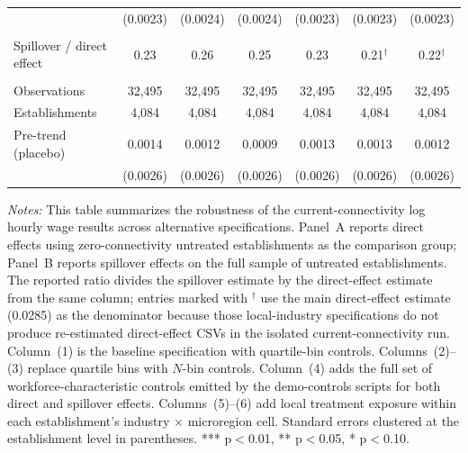 \begin{table}[H]
\begin{tabular}{lcccccc}
 & (0.0023) & (0.0024) & (0.0024) & (0.0023) & (0.0023) & (0.0023)\\
 &  &  &  &  &  & \\
Spillover / direct effect & 0.23 & 0.26 & 0.25 & 0.23 & 0.21$^\dagger$ & 0.22$^\dagger$\\
 &  &  &  &  &  & \\
Observations & 32{,}495 & 32{,}495 & 32{,}495 & 32{,}495 & 32{,}495 & 32{,}495\\
Establishments & 4{,}084 & 4{,}084 & 4{,}084 & 4{,}084 & 4{,}084 & 4{,}084\\
\midrule
Pre-trend (placebo) & 0.0014 & 0.0012 & 0.0009 & 0.0013 & 0.0013 & 0.0012\\
 & (0.0026) & (0.0026) & (0.0026) & (0.0026) & (0.0026) & (0.0026)\\
\bottomrule\bottomrule
\end{tabular}
\begin{minipage}{\linewidth}
    \scriptsize\vspace{4pt}
    \textit{Notes:} This table summarizes the robustness of the current-connectivity log hourly wage results across alternative specifications. Panel~A reports direct effects using zero-connectivity untreated establishments as the comparison group; Panel~B reports spillover effects on the full sample of untreated establishments. The reported ratio divides the spillover estimate by the direct-effect estimate from the same column; entries marked with $^\dagger$ use the main direct-effect estimate (0.0285) as the denominator because those local-industry specifications do not produce re-estimated direct-effect CSVs in the isolated current-connectivity run. Column~(1) is the baseline specification with quartile-bin controls. Columns~(2)--(3) replace quartile bins with $N$-bin controls. Column~(4) adds the full set of workforce-characteristic controls emitted by the demo-controls scripts for both direct and spillover effects. Columns~(5)--(6) add local treatment exposure within each establishment's industry $\times$ microregion cell. Standard errors clustered at the establishment level in parentheses. *** p$<$0.01, ** p$<$0.05, * p$<$0.10.
\end{minipage}
\end{table}
